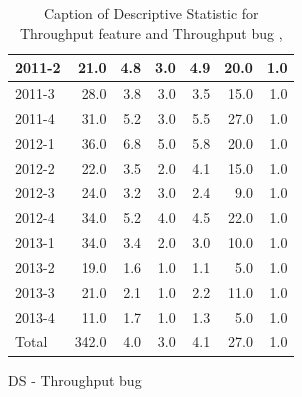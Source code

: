 \documentclass[UKenglish]{ifimaster}  %
\begin{document}
\begin{appendices}
\begin{table}[!htbp]
\begin{adjustwidth}{-2.5cm}{}
\begin{subfigure}[b]{0.3\textwidth}
{\begin{tabular}{ | l | r | r | r | r | r | r | }
2011-2 & 21.0 & 4.8 & 3.0 & 4.9 & 20.0 & 1.0\\ \hline
2011-3 & 28.0 & 3.8 & 3.0 & 3.5 & 15.0 & 1.0\\ \hline
2011-4 & 31.0 & 5.2 & 3.0 & 5.5 & 27.0 & 1.0\\ \hline
2012-1 & 36.0 & 6.8 & 5.0 & 5.8 & 20.0 & 1.0\\ \hline
2012-2 & 22.0 & 3.5 & 2.0 & 4.1 & 15.0 & 1.0\\ \hline
2012-3 & 24.0 & 3.2 & 3.0 & 2.4 & 9.0 & 1.0\\ \hline
2012-4 & 34.0 & 5.2 & 4.0 & 4.5 & 22.0 & 1.0\\ \hline
2013-1 & 34.0 & 3.4 & 2.0 & 3.0 & 10.0 & 1.0\\ \hline
2013-2 & 19.0 & 1.6 & 1.0 & 1.1 & 5.0 & 1.0\\ \hline
2013-3 & 21.0 & 2.1 & 1.0 & 2.2 & 11.0 & 1.0\\ \hline
2013-4 & 11.0 & 1.7 & 1.0 & 1.3 & 5.0 & 1.0\\ \hline
Total & 342.0 & 4.0 & 3.0 & 4.1 & 27.0 & 1.0\\ \hline
\end{tabular}
}
\caption{DS - Throughput bug}
 \label{DS:TPB:3}
\end{subfigure}
\end{adjustwidth}
\caption[Optional caption for list of figures]{Caption of Descriptive Statistic for Throughput feature and Throughput bug  , }
\label{DS:3:2}
\end{table}





\end{appendices}
\end{document}
